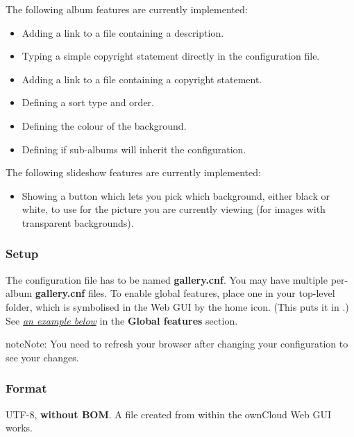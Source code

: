 \documentclass[letterpaper,10pt,english]{sphinxmanual}
\begin{document}
The following album features are currently implemented:
\begin{itemize}
\item {} 
Adding a link to a file containing a description.

\item {} 
Typing a simple copyright statement directly in the configuration file.

\item {} 
Adding a link to a file containing a copyright statement.

\item {} 
Defining a sort type and order.

\item {} 
Defining the colour of the background.

\item {} 
Defining if sub-albums will inherit the configuration.

\end{itemize}

The following slideshow features are currently implemented:
\begin{itemize}
\item {} 
Showing a button which lets you pick which background, either black or
white, to use for the picture you are currently viewing (for images with
transparent backgrounds).

\end{itemize}


\subsubsection{Setup}
\label{files/gallery_app:setup}
The configuration file has to be named \textbf{gallery.cnf}. You may have multiple
per-album \textbf{gallery.cnf} files. To enable global features, place one in your
top-level folder, which is symbolised in the Web GUI by the home icon. (This
puts it in .) See {\hyperref[files/gallery_app:supported-variables-label]{\emph{an example below}}} in the \textbf{Global features} section.

\begin{notice}{note}{Note:}
You need to refresh your browser after changing your configuration to
see your changes.
\end{notice}


\subsubsection{Format}
\label{files/gallery_app:format}
UTF-8, \textbf{without BOM}. A file created from within the ownCloud Web GUI works.
\end{document}
